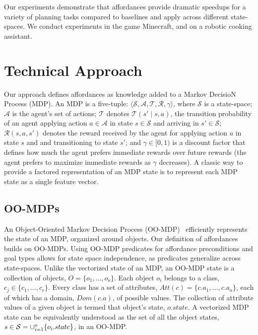 \documentclass[conference]{IEEEtran}
\begin{document}

Our experiments demonstrate that affordances provide dramatic speedups for a variety
of planning tasks compared to baselines and apply across different state-spaces.  We 
conduct experiments in the game Minecraft, and on a robotic cooking assistant. 

\section{Technical Approach}
\label{sec:technical_approach}

Our approach defines affordances as knowledge added to a Markov
DecisioN Process (MDP).  An MDP is a five-tuple: $\langle \mathcal{S},
\mathcal{A}, \mathcal{T}, \mathcal{R}, \gamma \rangle$, where
$\mathcal{S}$ is a state-space; $\mathcal{A}$ is the agent's set of
actions; $\mathcal{T}$ denotes $\mathcal{T}(s' \mid s,a)$, the
transition probability of an agent applying action $a \in \mathcal{A}$
in state $s \in \mathcal{S}$ and arriving in $s' \in \mathcal{S}$;
$\mathcal{R}(s,a,s')$ denotes the reward received by the agent for
applying action $a$ in state $s$ and and transitioning to state $s'$;
and $\gamma \in [0, 1)$ is a discount factor that defines how much the
  agent prefers immediate rewards over future rewards (the agent
  prefers to maximize immediate rewards as $\gamma$ decreases). A
  classic way to provide a factored representation of an MDP state is
  to represent each MDP state as a single feature vector.

\subsection{OO-MDPs}
An Object-Oriented Markov Decision Process (OO-MDP)~\citep{diuk08}
efficiently represents the state of an MDP, organized around
objects. Our definition of affordances builds on OO-MDPs. Using OO-MDP
predicates for affordance preconditions and goal types allows for
state space independence, as predicates generalize across
state-spaces.  Unlike the vectorized state of an MDP, an OO-MDP state
is a collection of objects, $O = \{o_1, \ldots, o_o \}$.  Each object
$o_i$ belongs to a class, $c_j \in \{c_1, \ldots, c_c\}$. Every class
has a set of attributes, $Att(c) = \{c.a_1, \ldots, c.a_a \}$, each of
which has a domain, $Dom(c.a)$, of possible values. The collection of
attribute values of a given object is termed that object's state,
$o.state$. A vectorized MDP state can be equivalently understood as
the set of all the object states, $s \in {\cal S} = \cup_{i = 1}^o
\{o_i.state\}$, in an OO-MDP.
\end{document}
